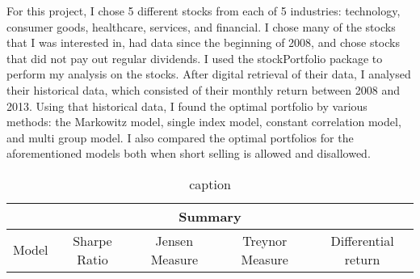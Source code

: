 \documentclass{article}
\begin{document}
For this project, I chose 5 different stocks from each of 5 industries: technology, consumer goods, healthcare, services, and financial. I chose many of the stocks that I was interested in, had data since the beginning of 2008, and chose stocks that did not pay out regular dividends. I used the stockPortfolio package to perform my analysis on the stocks. After digital retrieval of their data, I analysed their historical data, which consisted of their monthly return between 2008 and 2013. Using that historical data, I found the optimal portfolio by various methods: the Markowitz model, single index model, constant correlation model, and multi group model. I also compared the optimal portfolios for the aforementioned models both when short selling is allowed and disallowed. 

\begin{table}[b]
 \centering
  \begin{tabular}{ | c | c | c | c | c | }
   \hline 
   \multicolumn{5}{|c|}{Summary} \\ \hline 
   Model & Sharpe Ratio  & Jensen Measure & Treynor Measure & Differential return \\ \hline  

  \end{tabular}
 \caption{caption}  
 \label{tabel}
\end{table}
\end{document}
